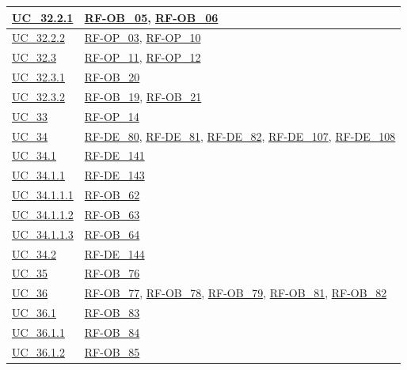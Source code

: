 \begin{longtable}{|
        >{\raggedright\arraybackslash}p{} |
        >{\raggedright\arraybackslash}p{} |
    }
    \hline
    \hyperref[uc_32.2.1]{UC\_32.2.1} & \hyperlink{rf-ob_5}{RF-OB\_05}, \hyperlink{rf-ob_6}{RF-OB\_06} \\
    \hline
    \hyperref[uc_32.2.2]{UC\_32.2.2} & \hyperlink{rf-op_3}{RF-OP\_03}, \hyperlink{rf-op_10}{RF-OP\_10} \\
    \hline
    \hyperref[uc_32.3]{UC\_32.3} & \hyperlink{rf-op_11}{RF-OP\_11}, \hyperlink{rf-op_12}{RF-OP\_12} \\
    \hline
    \hyperref[uc_32.3.1]{UC\_32.3.1} & \hyperlink{rf-ob_20}{RF-OB\_20} \\
    \hline
    \hyperref[uc_32.3.2]{UC\_32.3.2} & \hyperlink{rf-ob_19}{RF-OB\_19}, \hyperlink{rf-ob_21}{RF-OB\_21} \\
    \hline
    \hyperref[uc_33]{UC\_33} & \hyperlink{rf-op_14}{RF-OP\_14} \\
    \hline
    \hyperref[uc_34]{UC\_34} & \hyperlink{rf-de_80}{RF-DE\_80}, \hyperlink{rf-de_81}{RF-DE\_81}, \hyperlink{rf-de_82}{RF-DE\_82}, \hyperlink{rf-de_107}{RF-DE\_107}, \hyperlink{rf-de_108}{RF-DE\_108} \\
    \hline
    \hyperref[uc_34.1]{UC\_34.1} & \hyperlink{rf-de_141}{RF-DE\_141} \\
    \hline
    \hyperref[uc_34.1.1]{UC\_34.1.1} & \hyperlink{rf-de_143}{RF-DE\_143} \\
    \hline
    \hyperref[uc_34.1.1.1]{UC\_34.1.1.1} & \hyperlink{rf-ob_62}{RF-OB\_62} \\
    \hline
    \hyperref[uc_34.1.1.2]{UC\_34.1.1.2} & \hyperlink{rf-ob_63}{RF-OB\_63} \\
    \hline
    \hyperref[uc_34.1.1.3]{UC\_34.1.1.3} & \hyperlink{rf-ob_64}{RF-OB\_64} \\
    \hline
    \hyperref[uc_34.2]{UC\_34.2} & \hyperlink{rf-de_144}{RF-DE\_144} \\
    \hline
    \hyperref[uc_35]{UC\_35} & \hyperlink{rf-ob_76}{RF-OB\_76} \\
    \hline
    \hyperref[uc_36]{UC\_36} & \hyperlink{rf-ob_77}{RF-OB\_77}, \hyperlink{rf-ob_78}{RF-OB\_78}, \hyperlink{rf-ob_79}{RF-OB\_79}, \hyperlink{rf-ob_81}{RF-OB\_81}, \hyperlink{rf-ob_82}{RF-OB\_82} \\
    \hline
    \hyperref[uc_36.1]{UC\_36.1} & \hyperlink{rf-ob_83}{RF-OB\_83} \\
    \hline
    \hyperref[uc_36.1.1]{UC\_36.1.1} & \hyperlink{rf-ob_84}{RF-OB\_84} \\
    \hline
    \hyperref[uc_36.1.2]{UC\_36.1.2} & \hyperlink{rf-ob_85}{RF-OB\_85} \\

\end{longtable}
